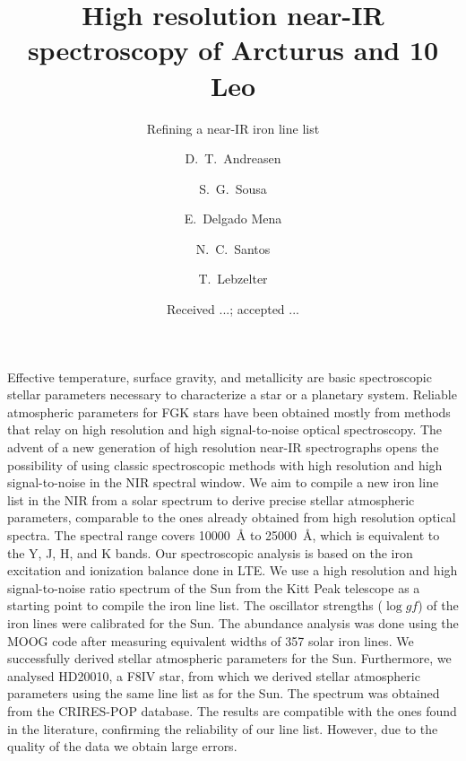 \documentclass{aa}
\begin{document}
\title{High resolution near-IR spectroscopy of Arcturus and 10 Leo}
\subtitle{Refining a near-IR iron line list}


\author{ D.~T.~Andreasen
    \and S.~G.~Sousa
    \and E.~Delgado Mena
    \and N.~C.~Santos
    \and T.~Lebzelter}







\date{Received ...; accepted ...}

\abstract
{Effective temperature, surface gravity, and metallicity are basic
spectroscopic stellar parameters necessary to characterize
a star or a planetary system. Reliable atmospheric parameters for
FGK stars have been obtained mostly from methods that relay on high
resolution and high signal-to-noise optical spectroscopy. The
advent of a new generation of high resolution near-IR spectrographs
opens the possibility of using classic spectroscopic methods with
high resolution and high signal-to-noise in the NIR spectral window.}
{We aim to compile a new iron line list in the NIR from a solar
spectrum to derive precise stellar atmospheric parameters,
comparable to the ones already obtained from high resolution optical
spectra. The spectral range covers \SI{10000}{\angstrom} to
\SI{25000}{\angstrom}, which is equivalent to the Y, J, H, and K bands.}
{Our spectroscopic analysis is based on the iron excitation and ionization
balance done in LTE. We use a high resolution and high signal-to-noise ratio
spectrum of the Sun from the Kitt Peak telescope as a starting point to compile
the iron line list. The oscillator strengths ($\log\mathit{gf}$) of the iron
lines were calibrated for the Sun. The abundance analysis was done using the
MOOG code after measuring equivalent widths of 357 solar iron lines.}
{We successfully derived stellar atmospheric parameters for the
Sun.
Furthermore, we analysed
HD20010, a F8IV star, from which we derived stellar atmospheric
parameters using the same line list as for the Sun. The spectrum
was obtained from the CRIRES-POP database.
The results are compatible with the ones found in the literature,
confirming the reliability of our line list. However, due to the
quality of the data we obtain large errors.}
{}
\end{document}
